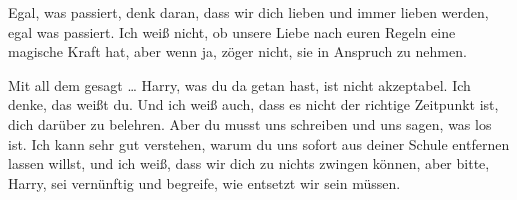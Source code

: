 \begin{writtenNote}
Egal, was passiert, denk daran, dass wir dich lieben und immer lieben werden, egal was passiert. Ich weiß nicht, ob unsere Liebe nach euren Regeln eine magische Kraft hat, aber wenn ja, zöger nicht, sie in Anspruch zu nehmen.

Mit all dem gesagt … Harry, was du da getan hast, ist nicht akzeptabel. Ich denke, das weißt du. Und ich weiß auch, dass es nicht der richtige Zeitpunkt ist, dich darüber zu belehren. Aber du musst uns schreiben und uns sagen, was los ist. Ich kann sehr gut verstehen, warum du uns sofort aus deiner Schule entfernen lassen willst, und ich weiß, dass wir dich zu nichts zwingen können, aber bitte, Harry, sei vernünftig und begreife, wie entsetzt wir sein müssen.


\end{writtenNote}
